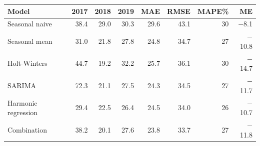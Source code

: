 \begin{tabular}{|l|r|r|r|r|r|r|r|}
\hline
\textbf{Model} & \textbf{2017} & \textbf{2018} & \textbf{2019} & \textbf{MAE} & \textbf{RMSE} & \textbf{MAPE\%} & \textbf{ME} \\\hline
Seasonal naive & 38.4 & 29.0 & 30.3 & 29.6 & 43.1 & 30 & \ensuremath{-}8.1 \\\hline
Seasonal mean & 31.0 & 21.8 & 27.8 & 24.8 & 34.7 & 27 & \ensuremath{-}10.8 \\\hline
Holt-Winters & 44.7 & 19.2 & 32.2 & 25.7 & 36.1 & 30 & \ensuremath{-}14.7 \\\hline
SARIMA & 72.3 & 21.1 & 27.5 & 24.3 & 34.5 & 27 & \ensuremath{-}11.7 \\\hline
Harmonic regression & 29.4 & 22.5 & 26.4 & 24.5 & 34.0 & 26 & \ensuremath{-}10.7 \\\hline
Combination & 38.2 & 20.1 & 27.6 & 23.8 & 33.7 & 27 & \ensuremath{-}11.8 \\\hline
\end{tabular}
